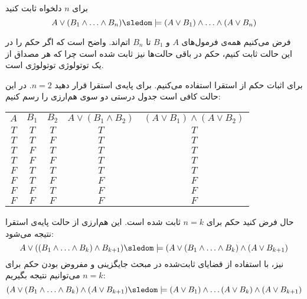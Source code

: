 برای $n$ دلخواه ثابت کنید
$$
A\vee (B_1\wedge\ldots\wedge B_n)\sledom\models(A\vee B_1)\wedge\ldots\wedge(A\vee B_n)
$$
\begin{ans}
فرض می‌کنیم همه‌ی فرمول‌های $A$ و $B_1$ تا $B_n$ اتم‌اند. واضح است که اگر حکم را در این حالت ثابت کنیم، حکم در باقی حالت‌ها نیز ثابت شده است چرا که هر مصداق از یک توتولوژی توتولوژی است.

برای اثبات حکم از استقرا استفاده می‌کنیم. برای پایه‌ی استقرا قرار دهید $n=2$. در این حالت کافی است جدول درستی دو سوی هم‌ارزی را رسم کنیم:

\begin{tabular}{c|c|c|c|c}
$A$ & $B_1$ & $B_2$ & $A\vee(B_1\wedge B_2)$ & $(A\vee B_1)\wedge(A\vee B_2)$ \\
$T$ & $T$ & $T$ & $T$ & $T$ \\
$T$ & $T$ & $F$ & $T$ & $T$ \\
$T$ & $F$ & $T$ & $T$ & $T$ \\
$T$ & $F$ & $F$ & $T$ & $T$ \\
$F$ & $T$ & $T$ & $T$ & $T$ \\
$F$ & $T$ & $F$ & $F$ & $F$ \\
$F$ & $F$ & $T$ & $F$ & $F$ \\
$F$ & $F$ & $F$ & $F$ & $F$ \\
\end{tabular}

حال فرض کنید حکم برای $n=k$ ثابت شده است. این هم‌ارزی از حالت پایه‌ی استقرا نتیجه می‌شود:
$$
A\vee ((B_1\wedge\ldots\wedge B_k)\wedge B_{k+1})\sledom\models (A\vee (B_1\wedge\ldots\wedge B_k)\wedge (A\vee B_{k+1})
$$
نیز، با استفاده از قضایای ثابت‌شده در مبحث جایگزینی و مفروض بودن حکم برای $n=k$ می‌توانیم نتیجه بگیریم:
$$
(A\vee (B_1\wedge\ldots\wedge B_k)\wedge (A\vee B_{k+1})\sledom\models(A\vee B_1)\wedge\ldots(A\vee B_k)\wedge(A\vee B_{k+1})
$$

\end{ans}

